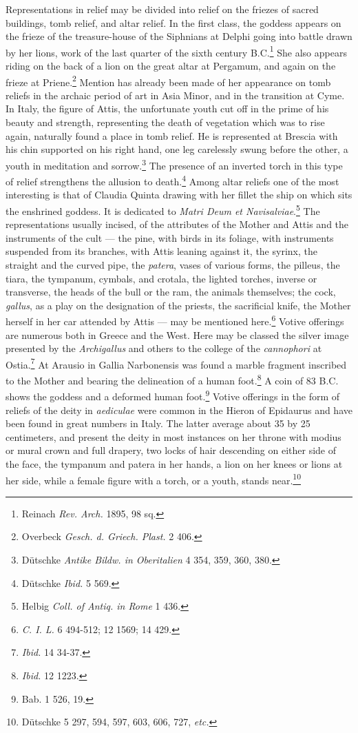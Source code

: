 \documentclass[a4paper, 11pt, oneside, polutonikogreek, english]{article}
\begin{document}
Representations in relief may be divided into relief on the friezes of sacred buildings, tomb relief, and altar relief. In the first class, the goddess appears on the frieze of the treasure-house of the Siphnians at Delphi going into battle drawn by her lions, work of the last quarter of the sixth century \textsc{B.C.}\footnote{Reinach \emph{Rev. Arch.} 1895, 98 sq.} She also appears riding on the back of a lion on the great altar at Pergamum, and again on the frieze at Priene.\footnote{Overbeck \emph{Gesch. d. Griech. Plast.} 2 406.} Mention has already been made of her appearance on tomb reliefs in the archaic period of art in Asia Minor, and in the transition at Cyme. In Italy, the figure of Attis, the unfortunate youth cut off in the prime of his beauty and strength, representing the death of vegetation which was to rise again, naturally found a place in tomb relief. He is represented at Brescia with his chin supported on his right hand, one leg carelessly swung before the other, a youth in meditation and sorrow.\footnote{Dütschke \emph{Antike Bildw. in Oberitalien} 4 354, 359, 360, 380.} The presence of an inverted torch in this type of relief strengthens the allusion to death.\footnote{Dütschke \emph{Ibid.} 5 569.} Among altar reliefs one of the most interesting is that of Claudia Quinta drawing with her fillet the ship on which sits the enshrined goddess. It is dedicated to \emph{Matri Deum et Navisalviae}.\footnote{Helbig \emph{Coll. of Antiq. in Rome} 1 436.} The representations usually incised, of the attributes of the Mother and Attis and the instruments of the cult --- the pine, with birds in its foliage, with instruments suspended from its branches, with Attis leaning against it, the syrinx, the straight and the curved pipe, the \emph{patera}, vases of various forms, the pilleus, the tiara, the tympanum, cymbals, and crotala, the lighted torches, inverse or transverse, the heads of the bull or the ram, the animals themselves; the cock, \emph{gallus}, as a play on the designation of the priests, the sacrificial knife, the Mother herself in her car attended by Attis --- may be mentioned here.\footnote{\emph{C. I. L.} 6 494-512; 12 1569; 14 429.} Votive offerings are numerous both in Greece and the West. Here may be classed the silver image presented by the \emph{Archigallus} and others to the college of the \emph{cannophori} at Ostia.\footnote{\emph{Ibid.} 14 34-37.} At Arausio in Gallia Narbonensis was found a marble fragment inscribed to the Mother and bearing the delineation of a human foot.\footnote{\emph{Ibid.} 12 1223.} A coin of 83 \textsc{B.C.} shows the goddess and a deformed human foot.\footnote{Bab. 1 526, 19.} Votive offerings in the form of reliefs of the deity in \emph{aediculae} were common in the Hieron of Epidaurus and have been found in great numbers in Italy. The latter average about 35 by 25 centimeters, and present the deity in most instances on her throne with modius or mural crown and full drapery, two locks of hair descending on either side of the face, the tympanum and patera in her hands, a lion on her knees or lions at her side, while a female figure with a torch, or a youth, stands near.\footnote{Dütschke 5 297, 594, 597, 603, 606, 727, \emph{etc.}}
\end{document}
